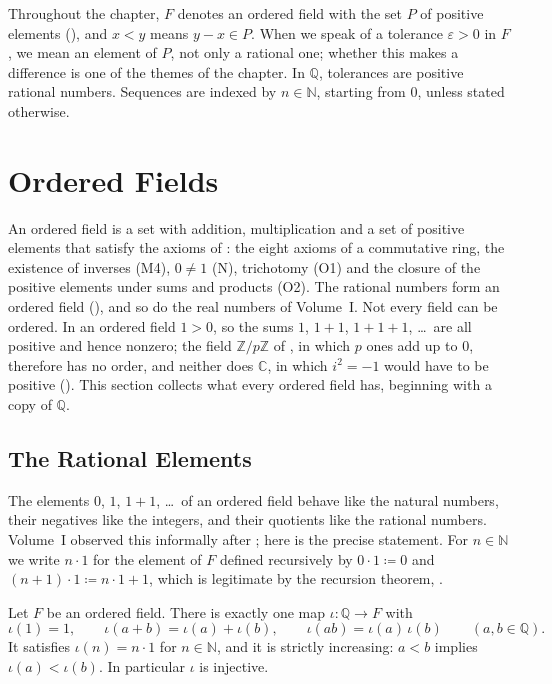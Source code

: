 Throughout the chapter, $F$ denotes an ordered field with the set $P$ of positive elements (), and $x<y$ means $y-x\in P$. When we speak of a tolerance $\varepsilon>0$ in $F$, we mean an element of $P$, not only a rational one; whether this makes a difference is one of the themes of the chapter. In $\mathbb Q$, tolerances are positive rational numbers. Sequences are indexed by $n\in\mathbb N$, starting from $0$, unless stated otherwise.

\section{Ordered Fields}
\label{sec:ordered-fields}

An ordered field is a set with addition, multiplication and a set of positive elements that satisfy the axioms of : the eight axioms of a commutative ring, the existence of inverses (M4), $0\ne1$ (N), trichotomy (O1) and the closure of the positive elements under sums and products (O2). The rational numbers form an ordered field (), and so do the real numbers of Volume~I. Not every field can be ordered. In an ordered field $1>0$, so the sums $1$, $1+1$, $1+1+1$, \ldots\ are all positive and hence nonzero; the field $\mathbb Z/p\mathbb Z$ of , in which $p$ ones add up to $0$, therefore has no order, and neither does $\mathbb C$, in which $i^2=-1$ would have to be positive (). This section collects what every ordered field has, beginning with a copy of $\mathbb Q$.

\subsection{The Rational Elements}

The elements $0$, $1$, $1+1$, \ldots\ of an ordered field behave like the natural numbers, their negatives like the integers, and their quotients like the rational numbers. Volume~I observed this informally after ; here is the precise statement. For $n\in\mathbb N$ we write $n\cdot1$ for the element of $F$ defined recursively by $0\cdot1\coloneqq0$ and $(n+1)\cdot1\coloneqq n\cdot1+1$, which is legitimate by the recursion theorem, .

\begin{proposition}
\label{prop:prime-field}
Let $F$ be an ordered field. There is exactly one map $\iota\colon\mathbb Q\to F$ with
\[
\iota(1)=1,\qquad\iota(a+b)=\iota(a)+\iota(b),\qquad\iota(ab)=\iota(a)\,\iota(b)\qquad(a,b\in\mathbb Q).
\]
It satisfies $\iota(n)=n\cdot1$ for $n\in\mathbb N$, and it is strictly increasing: $a<b$ implies $\iota(a)<\iota(b)$. In particular $\iota$ is injective.
\end{proposition}

